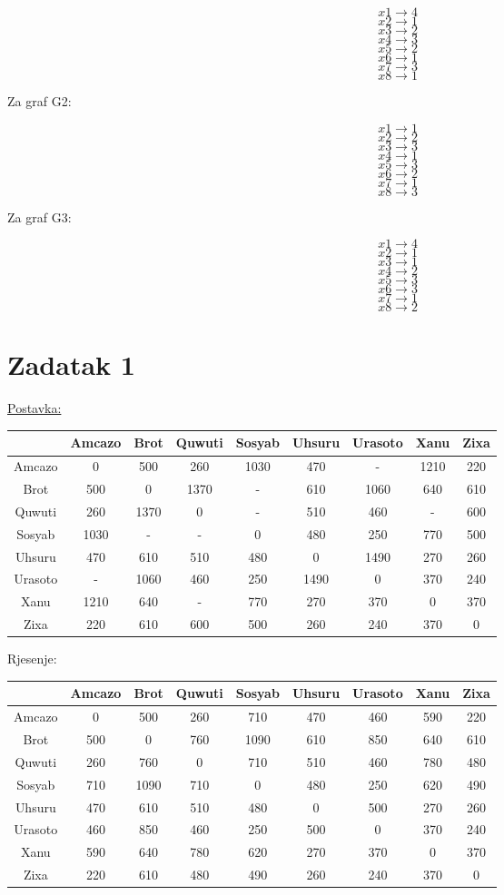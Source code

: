 \documentclass[12pt]{article}
\begin{document}
$$x1 \rightarrow 4$$
$$x2 \rightarrow 1$$
$$x3 \rightarrow 2$$
$$x4 \rightarrow 3$$
$$x5 \rightarrow 2$$
$$x6 \rightarrow 1$$
$$x7 \rightarrow 3$$
$$x8 \rightarrow 1$$

Za graf G2:

$$x1 \rightarrow 1$$
$$x2 \rightarrow 2$$
$$x3 \rightarrow 3$$
$$x4 \rightarrow 1$$
$$x5 \rightarrow 3$$
$$x6 \rightarrow 2$$
$$x7 \rightarrow 1$$
$$x8 \rightarrow 3$$

Za graf G3:

$$x1 \rightarrow 4$$
$$x2 \rightarrow 1$$
$$x3 \rightarrow 1$$
$$x4 \rightarrow 2$$
$$x5 \rightarrow 3$$
$$x6 \rightarrow 3$$
$$x7 \rightarrow 1$$
$$x8 \rightarrow 2$$


\newpage
\section*{Zadatak 1\label{Z1}}

\underline{Postavka:}

\begin{tabular}{ | c || c  | c | c | c | c | c | c | c | }
\hline
 & Amcazo & Brot & Quwuti & Sosyab & Uhsuru & Urasoto & Xanu & Zixa\\
 \hline
 \hline
Amcazo & 0 & 500 & 260 & 1030 & 470 & - & 1210 & 220\\
 \hline
Brot & 500 & 0 & 1370 & - & 610 & 1060 & 640 & 610\\
 \hline
Quwuti & 260 & 1370 & 0 & - & 510 & 460 & - & 600\\
 \hline
Sosyab & 1030 & - & - & 0 & 480 & 250 & 770 & 500\\
 \hline
Uhsuru & 470 & 610 & 510 & 480 & 0 & 1490 & 270 & 260\\
 \hline
Urasoto & - & 1060 & 460 & 250 & 1490 & 0 & 370 & 240\\
 \hline
Xanu & 1210 & 640 & - & 770 & 270 & 370 & 0 & 370\\
 \hline
Zixa & 220 & 610 & 600 & 500 & 260 & 240 & 370 & 0\\
 \hline
\end{tabular}

Rjesenje:

\begin{tabular}{ | c || c  | c | c | c | c | c | c | c | }
\hline
 & Amcazo & Brot & Quwuti & Sosyab & Uhsuru & Urasoto & Xanu & Zixa\\
 \hline
 \hline
Amcazo & 0 & 500 & 260 & 710 & 470 & 460 & 590 & 220\\
 \hline
Brot & 500 & 0 & 760 & 1090 & 610 & 850 & 640 & 610\\
 \hline
Quwuti & 260 & 760 & 0 & 710 & 510 & 460 & 780 & 480\\
 \hline
Sosyab & 710 & 1090 & 710 & 0 & 480 & 250 & 620 & 490\\
 \hline
Uhsuru & 470 & 610 & 510 & 480 & 0 & 500 & 270 & 260\\
 \hline
Urasoto & 460 & 850 & 460 & 250 & 500 & 0 & 370 & 240\\
 \hline
Xanu & 590 & 640 & 780 & 620 & 270 & 370 & 0 & 370\\
 \hline
Zixa & 220 & 610 & 480 & 490 & 260 & 240 & 370 & 0\\
 \hline
\end{tabular}
\end{document}
